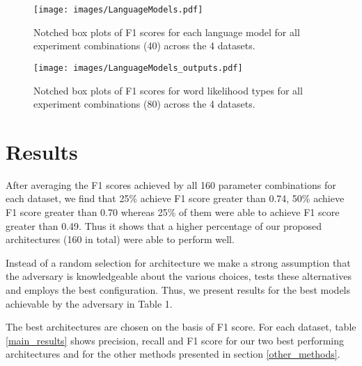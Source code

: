 
\begin{figure}
  \centering
  \texttt{[image: images/LanguageModels.pdf]}
  \caption{Notched box plots of F1 scores for each language model for all experiment combinations (40) across the 4 datasets.}\label{lm}
\end{figure}

\begin{figure}
  \centering
  \texttt{[image: images/LanguageModels\_outputs.pdf]}
  \caption{Notched box plots of F1 scores for word likelihood types for all experiment combinations (80) across the 4 datasets.}\label{lmot}
\end{figure}


\section{Results}
After averaging the F1 scores achieved by all 160 parameter combinations for each dataset, we find that 25\% achieve F1 score greater than 0.74, 50\% achieve F1 score greater than 0.70 whereas 25\% of them were able to achieve F1 score greater than 0.49.
%
Thus it shows that a higher percentage of our proposed architectures (160 in total) were able to perform well.

Instead of a random selection for architecture we make a strong assumption that the adversary is knowledgeable about the various choices, tests these alternatives and employs the best configuration. 
Thus, we present results for the best models achievable by the adversary in Table 1.

%
%
%
%
The best architectures are chosen on the basis of F1 score.
%
For each dataset, table \ref{main_results} shows precision, recall and F1 score for our two best performing architectures and for the other methods presented in section \ref{other_methods}.


